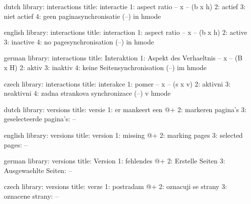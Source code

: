 


\startmessages  dutch  library: interactions
  title: interactie
      1: aspect ratio -- x -- (b x h)
      2: actief
      3: niet actief
      4: geen paginasynchronisatie (--) in hmode
\stopmessages

\startmessages  english  library: interactions
  title: interaction
      1: aspect ratio -- x -- (b x h)
      2: active
      3: inactive
      4: no pagesynchronisation (--) in hmode
\stopmessages

\startmessages  german  library: interactions
  title: Interaktion
      1: Aspekt des Verhaeltnis -- x -- (B x H)
      2: aktiv
      3: inaktiv
      4: keine Seitensynchronisation (--) im hmode
\stopmessages

\startmessages  czech  library: interactions
  title: interakce
      1: pomer -- x -- (s x v)
      2: aktivni
      3: neaktivni
      4: zadna strankova synchronizace (--) v hmode
\stopmessages

\startmessages  dutch  library: versions
  title: versie
      1: er mankeert een @+
      2: markeren pagina's
      3: geselecteerde pagina's: --
\stopmessages

\startmessages  english  library: versions
  title: version
      1: missing @+
      2: marking pages
      3: selected pages: --
\stopmessages

\startmessages  german  library: versions
  title: Version
      1: fehlendes @+
      2: Erstelle Seiten
      3: Ausgewaehlte Seiten: --
\stopmessages

\startmessages  czech  library: versions
  title: verze
      1: postradam @+
      2: oznacuji se strany
      3: oznacene strany: --
\stopmessages

\unprotect




